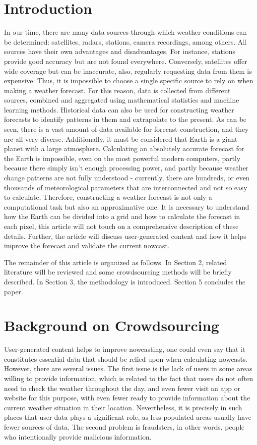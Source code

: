 \documentclass[conference]{IEEEtran}
\begin{document}
\section{Introduction}
In our time, there are many data sources through which weather conditions can be determined: satellites, radars, stations, camera recordings, among others. All sources have their own advantages and disadvantages. For instance, stations provide good accuracy but are not found everywhere. Conversely, satellites offer wide coverage but can be inaccurate, also, regularly requesting data from them is expensive. Thus, it is impossible to choose a single specific source to rely on when making a weather forecast. For this reason, data is collected from different sources, combined and aggregated using mathematical statistics and machine learning methods. Historical data can also be used for constructing weather forecasts to identify patterns in them and extrapolate to the present. As can be seen, there is a vast amount of data available for forecast construction, and they are all very diverse. Additionally, it must be considered that Earth is a giant planet with a large atmosphere. Calculating an absolutely accurate forecast for the Earth is impossible, even on the most powerful modern computers, partly because there simply isn't enough processing power, and partly because weather change patterns are not fully understood - currently, there are hundreds, or even thousands of meteorological parameters that are interconnected and not so easy to calculate. Therefore, constructing a weather forecast is not only a computational task but also an approximative one.
It is necessary to understand how the Earth can be divided into a grid and how to calculate the forecast in each pixel, this article will not touch on a comprehensive description of these details. Further, the article will discuss user-generated content and how it helps improve the forecast and validate the current nowcast.

The remainder of this article is organized as follows. In Section 2, related literature will be reviewed and some crowdsourcing methods will be briefly described. In Section 3, the methodology is introduced. Section 5 concludes the paper.

\section{Background on Crowdsourcing}

User-generated content helps to improve nowcasting, one could even say that it constitutes essential data that should be relied upon when calculating nowcasts. However, there are several issues. The first issue is the lack of users in some areas willing to provide information, which is related to the fact that users do not often need to check the weather throughout the day, and even fewer visit an app or website for this purpose, with even fewer ready to provide information about the current weather situation in their location. Nevertheless, it is precisely in such places that user data plays a significant role, as less populated areas usually have fewer sources of data. The second problem is fraudsters, in other words, people who intentionally provide malicious information.
\end{document}
